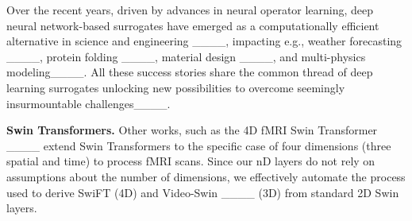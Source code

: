 Over the recent years, driven by advances in neural operator learning, deep neural network-based surrogates have emerged as a computationally efficient alternative in science and engineering ____, impacting e.g., weather forecasting ____, protein folding ____, material
design ____, and multi-physics modeling____. All these success stories share the common thread of deep learning surrogates unlocking new possibilities to overcome seemingly insurmountable challenges____.

\textbf{Swin Transformers.}
Other works, such as the 4D fMRI Swin Transformer ____ extend Swin Transformers to the specific case of four dimensions (three spatial and time) to process fMRI scans. 
Since our nD layers do not rely on assumptions about the number of dimensions, we effectively automate the process used to derive SwiFT (4D) and Video-Swin ____ (3D) from standard 2D Swin layers.